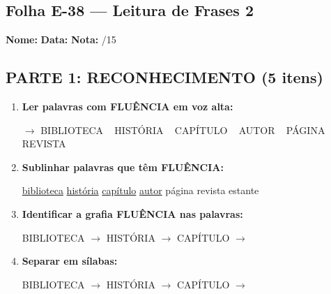 \subsection{Folha E-38 --- Leitura de Frases 2}
\begin{exercicio}



\noindent\textbf{Nome:} \underline{\hspace{3.2cm}} \quad \textbf{Data:} \underline{\hspace{1.6cm}} \quad \textbf{Nota:} \underline{\hspace{0.9cm}}/15


\subsection*{PARTE 1: RECONHECIMENTO (5 itens)}

\begin{enumerate}

  \item \textbf{Ler palavras com FLUÊNCIA em voz alta:}
  \begin{center}
  $\rightarrow$ BIBLIOTECA ~ HISTÓRIA ~ CAPÍTULO ~ AUTOR ~ PÁGINA ~ REVISTA
  \end{center}

  \item \textbf{Sublinhar palavras que têm FLUÊNCIA:}

\begin{center}
  \uline{biblioteca} \quad \uline{história} \quad \uline{capítulo} \quad \uline{autor} \quad página \quad revista \quad estante
\end{center}

  \item \textbf{Identificar a grafia FLUÊNCIA nas palavras:}
  \begin{center}
  BIBLIOTECA $\rightarrow$ \underline{\hspace{1cm}} \quad HISTÓRIA $\rightarrow$ \underline{\hspace{1cm}} \quad CAPÍTULO $\rightarrow$ \underline{\hspace{1cm}}
  \end{center}

  \item \textbf{Separar em sílabas:}
  \begin{center}
  BIBLIOTECA $\rightarrow$ \underline{\hspace{1.2cm}} \quad HISTÓRIA $\rightarrow$ \underline{\hspace{1.2cm}} \quad CAPÍTULO $\rightarrow$ \underline{\hspace{1.2cm}}
  \end{center}


\end{enumerate}
\end{exercicio}
